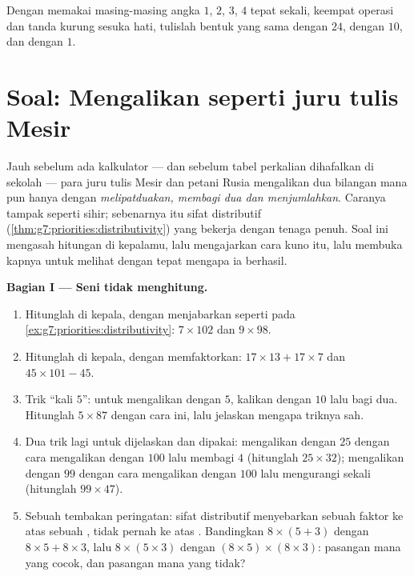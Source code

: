 \begin{exercise}[$\star\star\star$]\label{exo:g7:priorities:11}
Dengan memakai masing-masing angka $1$, $2$, $3$, $4$ tepat sekali,
keempat operasi dan tanda kurung sesuka hati, tulislah bentuk yang
sama dengan $24$, dengan $10$, dan dengan $1$.
\end{exercise}

\section{Soal: Mengalikan seperti juru tulis Mesir}

\begin{problem}
\label{pb:g7:priorities:1}
Jauh sebelum ada kalkulator --- dan sebelum tabel perkalian dihafalkan
di sekolah --- para juru tulis Mesir dan petani Rusia mengalikan dua
bilangan mana pun hanya dengan \emph{melipatduakan, membagi dua dan
menjumlahkan}. Caranya tampak seperti sihir; sebenarnya itu sifat
distributif (\cref{thm:g7:priorities:distributivity}) yang bekerja
dengan tenaga penuh. Soal ini mengasah hitungan di kepalamu, lalu
mengajarkan cara kuno itu, lalu membuka kapnya untuk melihat dengan
tepat mengapa ia berhasil.

\medskip
\noindent\textbf{Bagian I --- Seni tidak menghitung.}
\begin{enumerate}
  \item Hitunglah di kepala, dengan menjabarkan seperti pada
        \cref{ex:g7:priorities:distributivity}:
        $7 \times 102$ dan $9 \times 98$.
  \item Hitunglah di kepala, dengan memfaktorkan:
        $17 \times 13 + 17 \times 7$ dan
        $45 \times 101 - 45$.
  \item Trik ``kali $5$'': untuk mengalikan dengan $5$, kalikan dengan
        $10$ lalu bagi dua. Hitunglah $5 \times 87$ dengan cara ini,
        lalu jelaskan mengapa triknya sah.
  \item Dua trik lagi untuk dijelaskan dan dipakai: mengalikan dengan
        $25$ dengan cara mengalikan dengan $100$ lalu membagi $4$
        (hitunglah $25 \times 32$); mengalikan dengan $99$ dengan cara
        mengalikan dengan $100$ lalu mengurangi sekali (hitunglah
        $99 \times 47$).
  \item Sebuah tembakan peringatan: sifat distributif menyebarkan
        sebuah faktor ke atas sebuah \emph{}, tidak pernah ke
        atas . Bandingkan $8 \times (5 + 3)$ dengan
        $8 \times 5 + 8 \times 3$, lalu $8 \times (5 \times 3)$ dengan
        $(8 \times 5) \times (8 \times 3)$: pasangan mana yang cocok,
        dan pasangan mana yang tidak?
\end{enumerate}


\end{problem}

